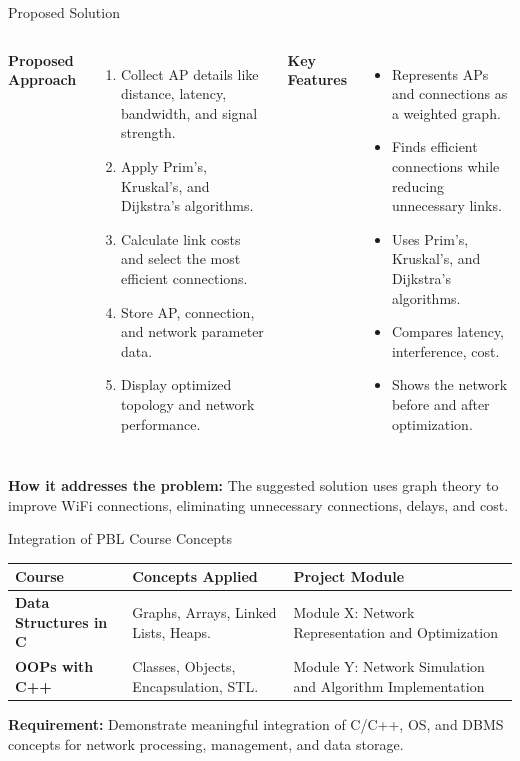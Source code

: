 \documentclass[aspectratio=169,11pt]{beamer}
\begin{document}
\begin{frame}{Proposed Solution}
\begin{columns}[T,totalwidth=\textwidth]
\scriptsize
\textbf{\color{GEUBlue}Proposed Approach}
\begin{enumerate}\itemsep3pt
\item Collect AP details like distance, latency, bandwidth, and signal strength.
\item Apply Prim's, Kruskal's, and Dijkstra's algorithms.
\item Calculate link costs and select the most efficient connections.
\item Store AP, connection, and network parameter data.
\item Display optimized topology and network performance.
\end{enumerate}

\scriptsize
\textbf{\color{GEUBlue}Key Features}
\begin{itemize}\itemsep3pt
\item Represents APs and connections as a weighted graph.
\item Finds efficient connections while reducing unnecessary links.
\item Uses Prim's, Kruskal's, and Dijkstra's algorithms.
\item Compares latency, interference, cost.
\item Shows the network before and after optimization.
\end{itemize}
\end{columns}

\vspace{3mm}
{\fontsize{4.5}{5.2}\selectfont\color{GEUGrey}\textbf{How it addresses the problem:} The suggested solution uses graph theory to improve WiFi connections, eliminating unnecessary connections, delays, and cost.}
\end{frame}

\begin{frame}{Integration of PBL Course Concepts}
\scriptsize
\begin{center}
\renewcommand{\arraystretch}{1.25}
\begin{tabularx}{.96\textwidth}{@{}>{\bfseries}p{3.0cm}X p{3.0cm}@{}}
\toprule
Course & Concepts Applied & Project Module\\
\midrule
Data Structures in C & Graphs, Arrays, Linked Lists, Heaps. & Module X: Network Representation and Optimization\\
OOPs with C++ & Classes, Objects, Encapsulation, STL. & Module Y: Network Simulation and Algorithm Implementation\\
\bottomrule
\end{tabularx}
\end{center}

\vfill
\begin{center}
\colorbox{GEULightBlue}{\parbox{.86\textwidth}{\centering
\textbf{Requirement:} Demonstrate meaningful integration of C/C++, OS, and DBMS concepts for network processing, management, and data storage.}}
\end{center}
\end{frame}
\end{document}
